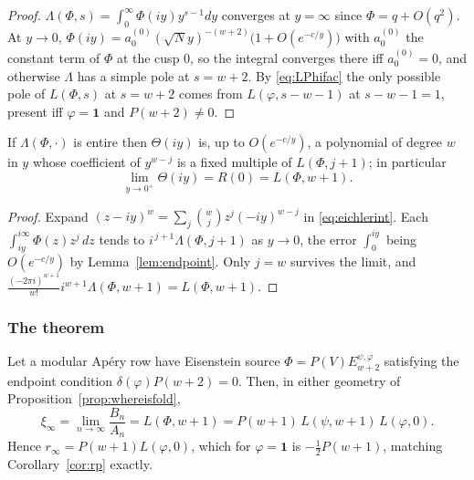 \begin{proof}
$\Lambda(\Phi,s)=\int_0^\infty\Phi(iy)y^{s-1}dy$ converges at $y=\infty$ since
$\Phi=q+O(q^2)$.  At $y\to0$, $\Phi(iy)=a^{(0)}_0(\sqrt Ny)^{-(w+2)}
\bigl(1+O(e^{-c/y})\bigr)$ with $a^{(0)}_0$ the constant term of $\Phi$ at the
cusp $0$, so the integral converges there iff $a^{(0)}_0=0$, and otherwise
$\Lambda$ has a simple pole at $s=w+2$.  By \eqref{eq:LPhifac} the only
possible pole of $L(\Phi,s)$ at $s=w+2$ comes from $L(\varphi,s-w-1)$ at
$s-w-1=1$, present iff $\varphi=\mathbf 1$ and $P(w+2)\neq0$.
\end{proof}

\begin{lemma}\label{lem:cuspvalue}
\Proved{} If $\Lambda(\Phi,\cdot)$ is entire then $\Theta(iy)$ is, up to
$O(e^{-c/y})$, a polynomial of degree $w$ in $y$ whose coefficient of
$y^{w-j}$ is a fixed multiple of $L(\Phi,j+1)$; in particular
\[
\lim_{y\to0^+}\Theta(iy)=R(0)=L(\Phi,w+1).
\]
\end{lemma}

\begin{proof}
Expand $(z-iy)^w=\sum_j\binom wjz^j(-iy)^{w-j}$ in \eqref{eq:eichlerint}.  Each
$\int_{iy}^{i\infty}\Phi(z)z^j\,dz$ tends to $i^{\,j+1}\Lambda(\Phi,j+1)$ as
$y\to0$, the error $\int_0^{iy}$ being $O(e^{-c/y})$ by Lemma~\ref{lem:endpoint}.
Only $j=w$ survives the limit, and
$\frac{(-2\pi i)^{w+1}}{w!}i^{w+1}\Lambda(\Phi,w+1)=L(\Phi,w+1)$.
\end{proof}

\subsubsection*{The theorem}

\begin{namedthm}\label{thm:Bexact}
\Proved{} Let a modular Ap\'ery row have Eisenstein source
$\Phi=P(V)E^{\psi,\varphi}_{w+2}$ satisfying the endpoint condition
$\delta(\varphi)P(w+2)=0$.  Then, in either geometry of
Proposition~\ref{prop:whereisfold},
\begin{equation}\label{eq:Bexact}
\boxed{\ \xi_\infty=\lim_{n\to\infty}\frac{B_n}{A_n}=L(\Phi,w+1)
=P(w+1)\,L(\psi,w+1)\,L(\varphi,0).\ }
\end{equation}
Hence $r_\infty=P(w+1)L(\varphi,0)$, which for $\varphi=\mathbf 1$ is
$-\tfrac12P(w+1)$, matching Corollary~\ref{cor:rp} exactly.
\end{namedthm}

